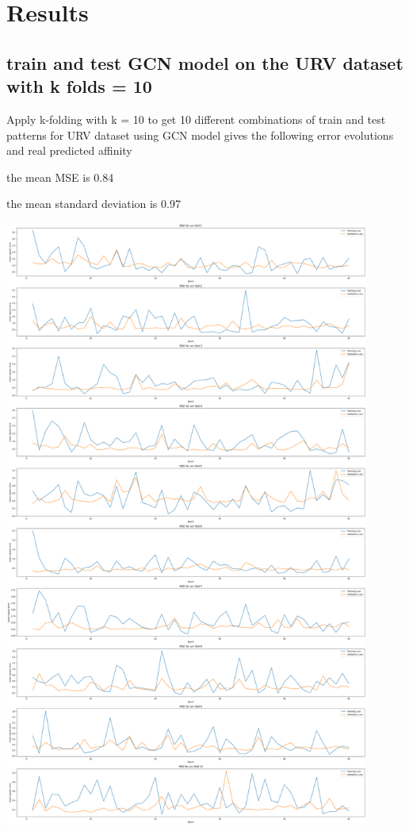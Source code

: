 \documentclass[11pt, a4paper]{article}
\begin{document}
\section{Results}
    \subsection{train and test GCN model on the URV dataset with k folds = 10}
    Apply k-folding with k = 10 to get 10 different combinations of train and test patterns for URV dataset using GCN model gives the following error evolutions and real predicted affinity
    
    the mean MSE is 0.84
    
    the mean standard deviation is 0.97
    \begin{center}
        \includegraphics[width=0.9\textwidth]{GCN_folds10errors.png}
    \end{center}
\end{document}
